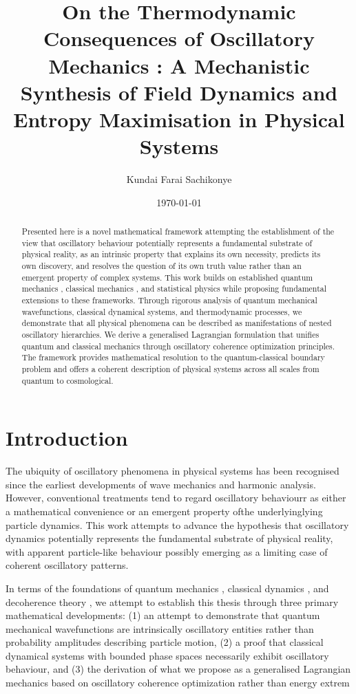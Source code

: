 \documentclass[11pt]{article}
\title{On the Thermodynamic Consequences of Oscillatory Mechanics : A Mechanistic Synthesis of Field Dynamics and Entropy Maximisation in Physical Systems }
\author{Kundai Farai Sachikonye}
\date{\today}
\theoremstyle{remark}
\begin{document}
\maketitle

\begin{abstract}
Presented here is a novel mathematical framework attempting the establishment of the view that oscillatory behaviour potentially represents a fundamental substrate of physical reality, as an intrinsic property that explains its own necessity, predicts its own discovery, and resolves the question of its own truth value rather than an emergent property of complex systems. This work builds on established quantum mechanics \cite{dirac1958quantum}, classical mechanics \cite{goldstein2002classical,landau1976mechanics}, and statistical physics \cite{pathria2011statistical} while proposing fundamental extensions to these frameworks. Through rigorous analysis of quantum mechanical wavefunctions, classical dynamical systems, and thermodynamic processes, we demonstrate that all physical phenomena can be described as manifestations of nested oscillatory hierarchies. We derive a generalised Lagrangian formulation that unifies quantum and classical mechanics through oscillatory coherence optimization principles. The framework provides mathematical resolution to the quantum-classical boundary problem and offers a coherent description of physical systems across all scales from quantum to cosmological.
\end{abstract}

\section{Introduction}

The ubiquity of oscillatory phenomena in physical systems has been recognised since the earliest developments of wave mechanics and harmonic analysis. However, conventional treatments tend to regard oscillatory behaviourr as either a mathematical convenience or an emergent property ofthe underlyinglying particle dynamics. This work attempts to advance the hypothesis that oscillatory dynamics potentially represents the fundamental substrate of physical reality, with apparent particle-like behaviour possibly emerging as a limiting case of coherent oscillatory patterns.

In terms of the foundations of quantum mechanics \cite{dirac1958quantum}, classical dynamics \cite{arnold1978mathematical}, and decoherence theory \cite{zurek2003decoherence}, we attempt to establish this thesis through three primary mathematical developments: (1) an attempt to demonstrate that quantum mechanical wavefunctions are intrinsically oscillatory entities rather than probability amplitudes describing particle motion, (2) a proof that classical dynamical systems with bounded phase spaces necessarily exhibit oscillatory behaviour, and (3) the derivation of what we propose as a generalised Lagrangian mechanics based on oscillatory coherence optimization rather than energy extrem
\end{document}
